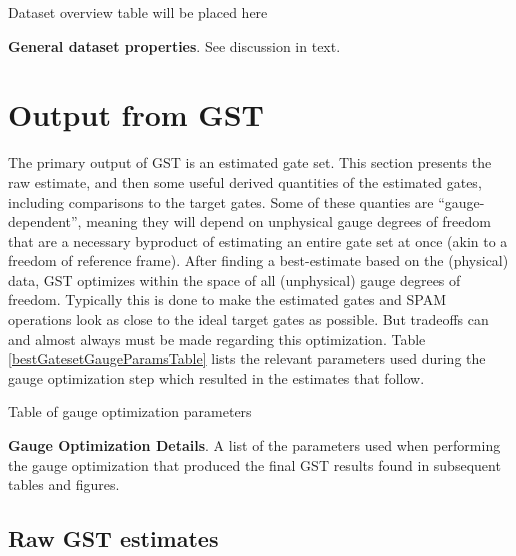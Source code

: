 \documentclass{article}[11pt]
\newcommand{\putfield}[2]{#2}
\begin{document}
\begin{table}[h]
\begin{center}
\putfield{datasetOverviewTable}{Dataset overview table will be placed here}
\caption{\putfield{tt_datasetOverviewTable}{}\textbf{General dataset properties}.  See discussion in text.\label{datasetOverviewTable}}
\end{center}
\end{table}

\section{Output from GST\label{secOutput}}

The primary output of GST is an estimated gate set.  This section presents the raw estimate, and then some useful derived quantities of the estimated gates, including comparisons to the target gates.  Some of these quanties are ``gauge-dependent'', meaning they will depend on unphysical gauge degrees of freedom that are a necessary byproduct of estimating an entire gate set at once (akin to a freedom of reference frame).  After finding a best-estimate based on the (physical) data, GST optimizes within the space of all (unphysical) gauge degrees of freedom.  Typically this is done to make the estimated gates and SPAM operations look as close to the ideal target gates as possible.  But tradeoffs can and almost always must be made regarding this optimization.  Table \ref{bestGatesetGaugeParamsTable} lists the relevant parameters used during the gauge optimization step which resulted in the estimates that follow.


\begin{table}[h]
\begin{center}
\putfield{bestGatesetGaugeOptParamsTable}{Table of gauge optimization parameters}
\caption{\putfield{tt_bestGatesetGaugeOptParamsTable}{}\textbf{Gauge Optimization Details}.  A list of the parameters used when performing the gauge optimization that produced the final GST results found in subsequent tables and figures.\label{bestGatesetGaugeParamsTable}}
\end{center}
\end{table}


\subsection{Raw GST estimates}
\end{document}
